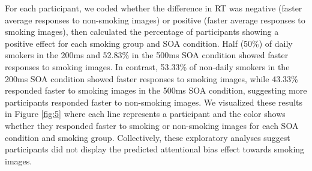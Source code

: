 \documentclass[empirical, authordate]{jote-new-article}
\begin{document}
For each participant, we coded whether the difference in RT was negative (faster average responses to non-smoking images) or positive (faster average responses to smoking images), then calculated the percentage of participants showing a positive effect for each smoking group and SOA condition. Half (50\%) of daily smokers in the 200ms and 52.83\% in the 500ms SOA condition showed faster responses to smoking images. In contrast, 53.33\% of non-daily smokers in the 200ms SOA condition showed faster responses to smoking images, while 43.33\% responded faster to smoking images in the 500ms SOA condition, suggesting more participants responded faster to non-smoking images. We visualized these results in Figure \ref{fig:5} where each line represents a participant and the color shows whether they responded faster to smoking or non-smoking images for each SOA condition and smoking group. Collectively, these exploratory analyses suggest participants did not display the predicted attentional bias effect towards smoking images.
\end{document}
